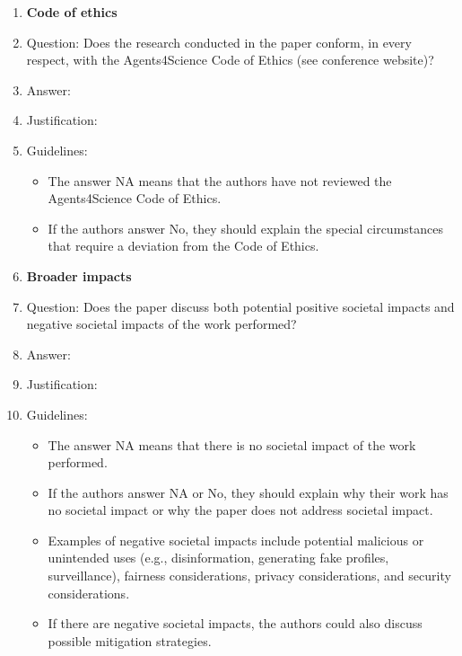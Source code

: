\documentclass{article}
\begin{document}
\begin{enumerate}
\item {\bf Code of ethics}
    \item[] Question: Does the research conducted in the paper conform, in every respect, with the Agents4Science Code of Ethics (see conference website)?
    \item[] Answer: \answerTODO{} %
    \item[] Justification: \justificationTODO{}
    \item[] Guidelines:
    \begin{itemize}
        \item The answer NA means that the authors have not reviewed the Agents4Science Code of Ethics.
        \item If the authors answer No, they should explain the special circumstances that require a deviation from the Code of Ethics.
    \end{itemize}


\item {\bf Broader impacts}
    \item[] Question: Does the paper discuss both potential positive societal impacts and negative societal impacts of the work performed?
    \item[] Answer: \answerTODO{} %
    \item[] Justification: \justificationTODO{}
    \item[] Guidelines:
    \begin{itemize}
        \item The answer NA means that there is no societal impact of the work performed.
        \item If the authors answer NA or No, they should explain why their work has no societal impact or why the paper does not address societal impact.
        \item Examples of negative societal impacts include potential malicious or unintended uses (e.g., disinformation, generating fake profiles, surveillance), fairness considerations, privacy considerations, and security considerations.
        \item If there are negative societal impacts, the authors could also discuss possible mitigation strategies.
    \end{itemize}


\end{enumerate}
\end{document}
